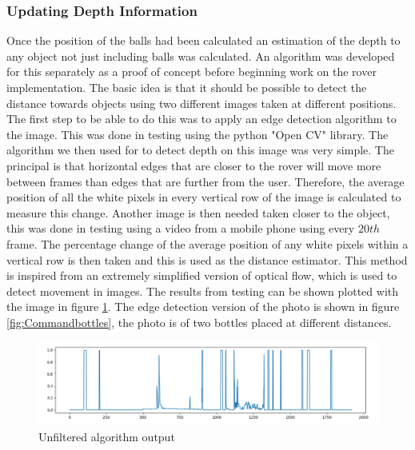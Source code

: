\documentclass[10pt,twoside]{article}
\begin{document}
\subsubsection{Updating Depth Information}
Once the position of the balls had been calculated an estimation of the depth to any object not just including balls was calculated. An algorithm was developed for this separately as a proof of concept before beginning work on the rover implementation. The basic idea is that it should be possible to detect the distance towards objects using two different images taken at different positions. The first step to be able to do this was to apply an edge detection algorithm to the image. This was done in testing using the python "Open CV" library. The algorithm we then used for to detect depth on this image was very simple. The principal is that horizontal edges that are closer to the rover will move more between frames than edges that are further from the user. Therefore, the average position of all the white pixels in every vertical row of the image is calculated to measure this change. Another image is then needed taken closer to the object, this was done in testing using a video from a mobile phone using every $20th$ frame. The percentage change of the average position of any white pixels within a vertical row is then taken and this is used as the distance estimator. This method is inspired from an extremely simplified version of optical flow, which is used to detect movement in images. The results from testing can be shown plotted with the image in figure \ref{fig:CommandUnfilteredVision}. The edge detection version of the photo is shown in figure \ref{fig:Commandbottles}, the photo is of two bottles placed at different distances.

\begin{figure}[hbt]
    \centering
    \includegraphics[scale = 0.4]{Commandunfilteredvision.png}
    \caption{Unfiltered algorithm output}
    \label{fig:CommandUnfilteredVision}
\end{figure}
\end{document}
